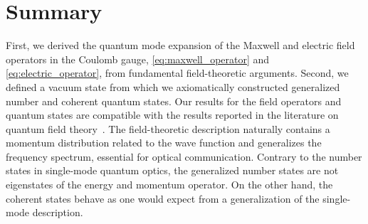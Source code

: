\section*{Summary}

First, we derived the quantum mode expansion of the Maxwell and electric field operators in the Coulomb gauge, \cref{eq:maxwell_operator} and \cref{eq:electric_operator}, from fundamental field-theoretic arguments.
Second, we defined a vacuum state from which we axiomatically constructed generalized number and coherent quantum states.
Our results for the field operators and quantum states are compatible with the results reported in the literature on quantum field theory~\cite{Itzykson2012,Greiner2013,Srednicki2007,Peskin1995}.
The field-theoretic description naturally contains a momentum distribution related to the wave function and generalizes the frequency spectrum, essential for optical communication.
Contrary to the number states in single-mode quantum optics, the generalized number states are not eigenstates of the energy and momentum operator.
On the other hand, the coherent states behave as one would expect from a generalization of the single-mode description.

